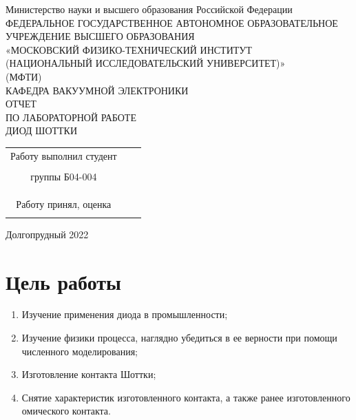 \documentclass[a4paper]{article}
\begin{document}
 
 \begin{titlepage}
\begin{center}
\hfill \break
Министерство науки и высшего образования Российской Федерации\\
ФЕДЕРАЛЬНОЕ ГОСУДАРСТВЕННОЕ АВТОНОМНОЕ ОБРАЗОВАТЕЛЬНОЕ\\ 
УЧРЕЖДЕНИЕ ВЫСШЕГО ОБРАЗОВАНИЯ\\ 
«МОСКОВСКИЙ ФИЗИКО-ТЕХНИЧЕСКИЙ ИНСТИТУТ\\ 
(НАЦИОНАЛЬНЫЙ ИССЛЕДОВАТЕЛЬСКИЙ УНИВЕРСИТЕТ)»\\
(МФТИ)\\
\hfill \break
\hfill \break
\hfill \break
\hfill \break
\hfill \break
\hfill \break
\hfill \break
\hfill \break
\hfill \break
\hfill \break
\hfill \break
КАФЕДРА ВАКУУМНОЙ ЭЛЕКТРОНИКИ\\
\hfill \break
ОТЧЕТ\\
ПО ЛАБОРАТОРНОЙ РАБОТЕ\\
\hfill \break
ДИОД ШОТТКИ\\
\end{center}
\hfill \break
\hfill \break
\hfill \break
\hfill \break
\hfill \break
\hfill \break
\hfill \break
\hfill \break
\begin{tabular}{ccc}
Работу выполнил студент  & \underline{\hspace{5cm}}&  \\\\
группы Б04-004& &   \\\\
 & &  \\\\
Работу принял, оценка & \underline{\hspace{5cm}} &  \\\\
\end{tabular}
\hfill \break
\hfill \break
\begin{center} Долгопрудный 2022 
\end{center}
\end{titlepage}

\section{Цель работы}
\begin{enumerate}
    \item Изучение применения диода в промышленности;
    \item Изучение физики процесса, наглядно убедиться в ее верности при помощи численного моделирования;
    \item Изготовление контакта Шоттки;
    \item Снятие характеристик изготовленного контакта, а также ранее изготовленного омического контакта.

\end{enumerate}
\end{document}
